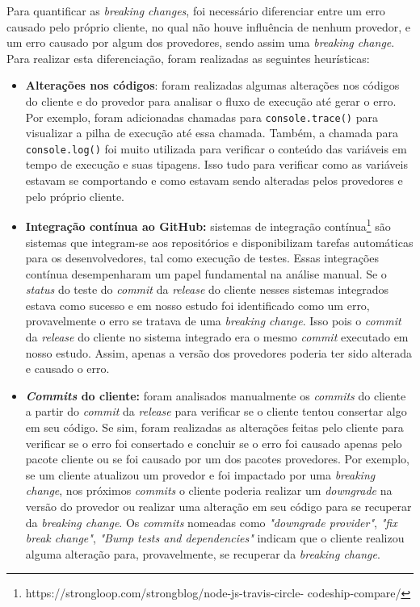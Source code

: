 Para quantificar as \textit{breaking changes}, foi necessário diferenciar entre um erro causado pelo próprio cliente, no qual não houve influência de nenhum provedor, e um erro causado por algum dos provedores, sendo assim uma \textit{breaking change}. Para realizar esta diferenciação, foram realizadas as seguintes heurísticas:

\begin{itemize}
    \item \textbf{Alterações nos códigos}: foram realizadas algumas alterações nos códigos do cliente e do provedor para analisar o fluxo de execução até gerar o erro. Por exemplo, foram adicionadas chamadas para \texttt{console.trace()} para visualizar a pilha de execução até essa chamada. Também, a chamada para \texttt{console.log()} foi muito utilizada para verificar o conteúdo das variáveis em tempo de execução e suas tipagens. Isso tudo para verificar como as variáveis estavam se comportando e como estavam sendo alteradas pelos provedores e pelo próprio cliente.

    \item \textbf{Integração contínua ao \textsf{GitHub}:} sistemas de integração contínua\footnote{https://strongloop.com/strongblog/node-js-travis-circle-
codeship-compare/} são sistemas que integram-se aos repositórios e disponibilizam tarefas automáticas para os desenvolvedores, tal como execução de testes. Essas integrações contínua desempenharam um papel fundamental na análise manual. Se o \textit{status} do teste do \textit{commit} da \textit{release} do cliente nesses sistemas integrados estava como sucesso e em nosso estudo foi identificado como um erro, provavelmente o erro se tratava de uma \textit{breaking change}. Isso pois o \textit{commit} da \textit{release} do cliente no sistema integrado era o mesmo \textit{commit} executado em nosso estudo. Assim, apenas a versão dos provedores poderia ter sido alterada e causado o erro.

    \item \textbf{\textit{Commits} do cliente:} foram analisados manualmente os \textit{commits} do cliente a partir do \textit{commit} da \textit{release} para verificar se o cliente tentou consertar algo em seu código. Se sim, foram realizadas as alterações feitas pelo cliente para verificar se o erro foi consertado e concluir se o erro foi causado apenas pelo pacote cliente ou se foi causado por um dos pacotes provedores. Por exemplo, se um cliente atualizou um provedor e foi impactado por uma \textit{breaking change}, nos próximos \textit{commits} o cliente poderia realizar um \textit{downgrade} na versão do provedor ou realizar uma alteração em seu código para se recuperar da \textit{breaking change}. Os \textit{commits} nomeadas como \textit{"downgrade provider"}, \textit{"fix break change"}, \textit{"Bump tests and dependencies"} indicam que o cliente realizou alguma alteração para, provavelmente, se recuperar da \textit{breaking change}.


\end{itemize}
